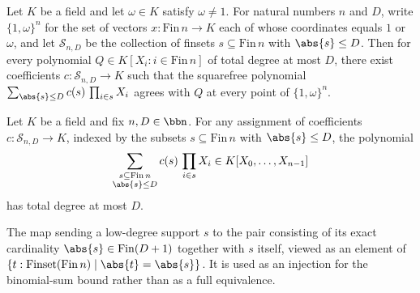 \begin{theorem}
\label{RazborovSmolensky.lowDegree_squarefree_complete_on_rootCube}
\leanok
{}
Let $K$ be a field and let $\omega \in K$ satisfy $\omega \ne 1$. For natural numbers
$n$ and $D$, write $\{1,\omega\}^n$ for the set of vectors $x : \mathrm{Fin}\,n \to K$
each of whose coordinates equals $1$ or $\omega$, and let $\mathcal{S}_{n,D}$ be the
collection of finsets $s \subseteq \mathrm{Fin}\,n$ with $\abs{s} \le D$. Then for every
polynomial $Q \in K[X_i : i \in \mathrm{Fin}\,n]$ of total degree at most $D$, there
exist coefficients $c : \mathcal{S}_{n,D} \to K$ such that the squarefree polynomial
$\sum_{\abs{s} \le D} c(s)\,\prod_{i \in s} X_i$ agrees with $Q$ at every point of
$\{1,\omega\}^n$.
\end{theorem}

\begin{lemma}
\label{RazborovSmolensky.lowDegreeSquarefreePolynomial_totalDegree_le}
\leanok
{}
Let $K$ be a field and fix $n, D \in \bbn$. For any assignment of coefficients $c \colon
\mathcal{S}_{n,D} \to K$, indexed by the subsets $s \subseteq \mathrm{Fin}\,n$ with
$\abs{s} \le D$, the polynomial
\[
\sum_{\substack{s \subseteq \mathrm{Fin}\,n \\ \abs{s} \le D}} c(s)\, \prod_{i \in s}
X_i \in K[X_0, \dots, X_{n-1}]
\]
has total degree at most $D$.
\end{lemma}

\begin{definition}
\label{RazborovSmolensky.lowDegreeSupportSigmaMap}
\leanok
{}
The map sending a low-degree support $s$ to the pair consisting of its exact cardinality
$\abs{s} \in \mathrm{Fin}(D+1)$ together with $s$ itself, viewed as an element of
$\{t : \mathrm{Finset}(\mathrm{Fin}\,n) \mid \abs{t} = \abs{s}\}$.  It is used as an
injection for the binomial-sum bound rather than as a full equivalence.
\end{definition}

